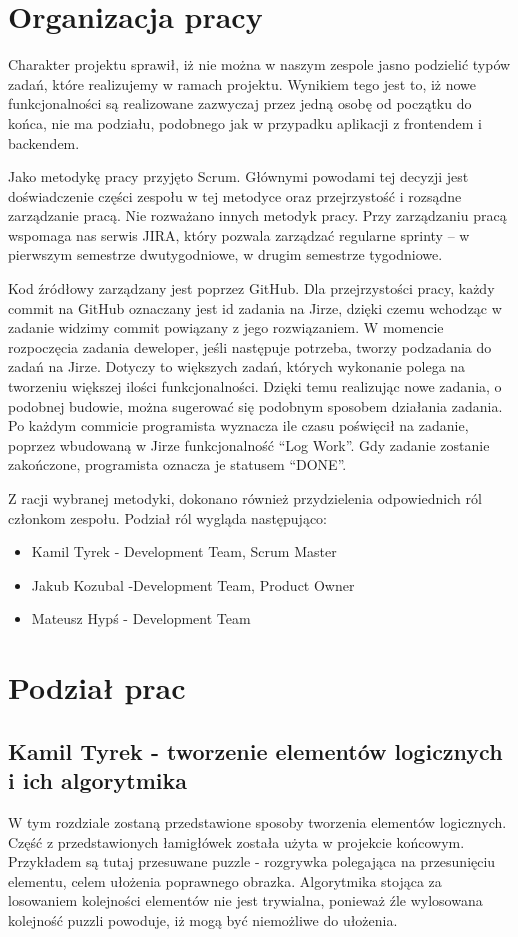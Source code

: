 \documentclass[oneside,polski,logo]{amuthesis}
\begin{document}
\section{Organizacja pracy}
Charakter projektu sprawił, iż nie można w naszym zespole jasno podzielić typów zadań, które realizujemy w ramach projektu. Wynikiem tego jest to, iż nowe funkcjonalności są realizowane zazwyczaj przez jedną osobę od początku do końca, nie ma podziału, podobnego jak w przypadku aplikacji z frontendem i backendem.


Jako metodykę pracy przyjęto Scrum. Głównymi powodami tej decyzji jest doświadczenie części zespołu w tej metodyce oraz przejrzystość i rozsądne zarządzanie pracą. Nie rozważano innych metodyk pracy. Przy zarządzaniu pracą wspomaga nas serwis JIRA, który pozwala zarządzać regularne sprinty – w pierwszym semestrze dwutygodniowe, w drugim semestrze tygodniowe. 


Kod źródłowy zarządzany jest poprzez GitHub. Dla przejrzystości pracy, każdy commit na GitHub oznaczany jest id zadania na Jirze, dzięki czemu wchodząc w zadanie widzimy commit powiązany z jego rozwiązaniem. W momencie rozpoczęcia zadania deweloper, jeśli następuje potrzeba, tworzy podzadania do zadań na Jirze. Dotyczy to większych zadań, których wykonanie polega na tworzeniu większej ilości funkcjonalności. Dzięki temu realizując nowe zadania, o podobnej budowie, można sugerować się podobnym sposobem działania zadania. Po każdym commicie programista wyznacza ile czasu poświęcił na zadanie, poprzez wbudowaną w Jirze funkcjonalność “Log Work”. Gdy zadanie zostanie zakończone, programista oznacza je statusem “DONE”.  


Z racji wybranej metodyki, dokonano również przydzielenia odpowiednich ról członkom zespołu. Podział ról wygląda następująco:

\begin{itemize}
	\item Kamil Tyrek - Development Team, Scrum Master
	\item Jakub Kozubal -Development Team, Product Owner
	\item Mateusz Hypś - Development Team
\end{itemize}

\section{Podział prac}
\subsection{Kamil Tyrek - tworzenie elementów logicznych i ich algorytmika}
W tym rozdziale zostaną przedstawione sposoby tworzenia elementów logicznych. Część z przedstawionych łamigłówek została użyta w projekcie końcowym. Przykładem są tutaj przesuwane puzzle - rozgrywka polegająca na przesunięciu elementu, celem ułożenia poprawnego obrazka. Algorytmika stojąca za losowaniem kolejności elementów nie jest trywialna, ponieważ źle wylosowana kolejność puzzli powoduje, iż mogą być niemożliwe do ułożenia.
\end{document}
